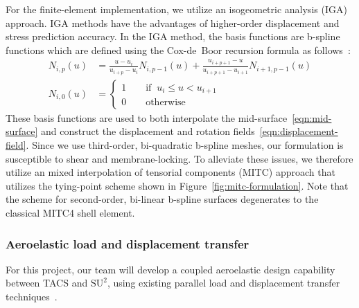 \documentclass[]{aiaa-tc}
\newcommand{\f}{\frac}
\begin{document}
For the finite-element implementation, we utilize an isogeometric
analysis (IGA) approach. IGA methods have the advantages of
higher-order displacement and stress prediction accuracy. In the IGA
method, the basis functions are b-spline functions which are defined
using the Cox-de~Boor recursion formula as follows~\cite{NURBSbook}:
%
\begin{equation}
  \label{eqn:b-spline-basis}
  \begin{aligned}
    N_{i,p}(u) & = \f{u - u_{i}}{u_{i+p} - u_{i}} N_{i,p-1}(u) + \f{u_{i+p+1} - u}{u_{i+p+1} - u_{i+1}}N_{i+1,p-1}(u) \\
    N_{i,0}(u) & = \left\{ 
      \begin{array}{l} 
        1 \qquad \text{if}\;\; u_{i} \le u < u_{i+1} \\
        0 \qquad \text{otherwise}
      \end{array} \right.
  \end{aligned}
\end{equation}
%
These basis functions are used to both interpolate the
mid-surface~\eqref{eqn:mid-surface} and construct the displacement and
rotation fields~\eqref{eqn:displacement-field}. Since we use
third-order, bi-quadratic b-spline meshes, our formulation is
susceptible to shear and membrane-locking. To alleviate these issues,
we therefore utilize an mixed interpolation of tensorial components
(MITC) approach that utilizes the tying-point scheme shown in
Figure~\ref{fig:mitc-formulation}.  Note that the scheme for
second-order, bi-linear b-spline surfaces degenerates to the classical
MITC4 shell element.

\subsubsection{Aeroelastic load and displacement transfer}

For this project, our team will develop a coupled aeroelastic design
capability between TACS and $\text{SU}^2$, using existing parallel
load and displacement transfer
techniques~\cite{Kennedy:2014:tacs-tripan}. 
\end{document}
